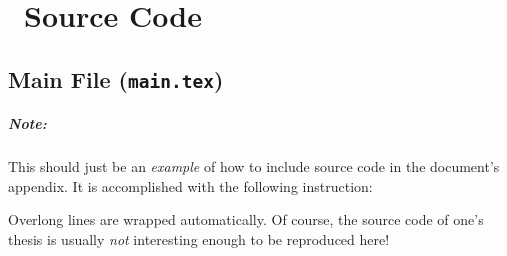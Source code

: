 \chapter{\latex\ Source Code}
\label{app:latex}

\section*{Main File (\texttt{main.tex})}

\paragraph{Note:}
This should just be an \emph{example} of how to include source code in the
document's appendix. It is accomplished with the following instruction:
%
\begin{LaTeXCode}[numbers=none]

\end{LaTeXCode}
%
Overlong lines are wrapped automatically. Of course, the \latex source code of
one's thesis is usually \emph{not} interesting enough to be reproduced here!


